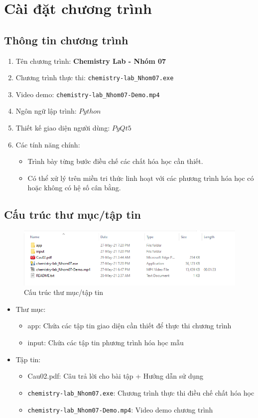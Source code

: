 \documentclass[a4paper]{article}
\begin{document}
	\section{Cài đặt chương trình}
	\subsection{Thông tin chương trình}
		\begin{enumerate}
			\item Tên chương trình: \textbf{Chemistry Lab - Nhóm 07}
			\item Chương trình thực thi: \texttt{chemistry-lab\_Nhom07.exe}
			\item Video demo: \texttt{chemistry-lab\_Nhom07-Demo.mp4}
			\item Ngôn ngữ lập trình: $Python$
			\item Thiết kế giao diện người dùng: $PyQt5$
			\item Các tính năng chính:
			\begin{itemize}
				\item Trình bày từng bước điều chế các chất hóa học cần thiết.
				\item Có thể xử lý trên miền tri thức linh hoạt với các phương trình hóa học có hoặc không có hệ số cân bằng.
			\end{itemize}
		\end{enumerate}
	
	\subsection{Cấu trúc thư mục/tập tin}
	\begin{figure}[h]
		\centering
		\includegraphics[width=0.7\linewidth]{images/folder-structure}
		\caption{Cấu trúc thư mục/tập tin}
		\label{fig:folder-structure}
	\end{figure}
	
	\begin{itemize}
		\item Thư mục:
		\begin{itemize}
			\item app: Chứa các tập tin giao diện cần thiết để thực thi chương trình
			\item input: Chứa các tập tin phương trình hóa học mẫu
		\end{itemize}
		
		\item Tập tin:
		\begin{itemize}
			\item Cau02.pdf: Câu trả lời cho bài tập + Hướng dẫn sử dụng
			\item \texttt{chemistry-lab\_Nhom07.exe}: Chương trình thực thi điều chế chất hóa học
			\item \texttt{chemistry-lab\_Nhom07-Demo.mp4}: Video demo chương trình
		\end{itemize}
	\end{itemize}
	
\end{document}

